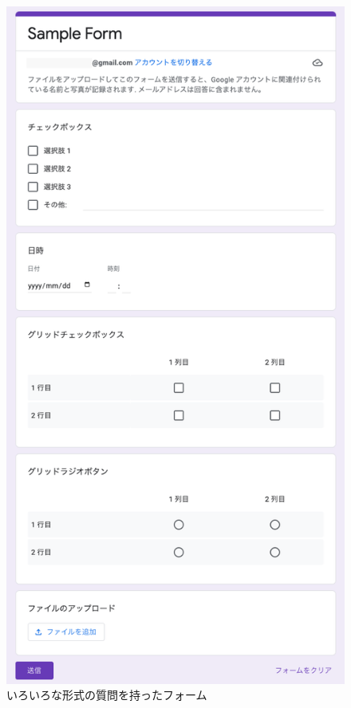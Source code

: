 \documentclass[uplatex,a4j]{jsarticle}
\begin{document}
\begin{figure}[H]
 \centering
 \includegraphics[keepaspectratio, scale=0.5]{images/various_question.png}
 \caption{いろいろな形式の質問を持ったフォーム}
 \label{fig:various_question}
\end{figure}
\end{document}
